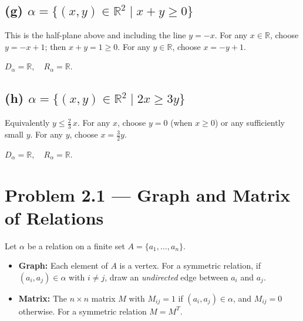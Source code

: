 \documentclass[12pt, a4paper]{article}
\newcommand{\R}{\mathbb{R}}
\begin{document}
\subsection*{(g)\; $\alpha = \{(x,y) \in \R^2 \mid x + y \ge 0\}$}

This is the half-plane above and including the line $y = -x$.
For any $x \in \R$, choose $y = -x + 1$; then $x + y = 1 \ge 0$.
For any $y \in \R$, choose $x = -y + 1$.

\begin{answerbox}
$D_\alpha = \R, \quad R_\alpha = \R.$
\end{answerbox}

\begin{center}
\end{center}

\subsection*{(h)\; $\alpha = \{(x,y) \in \R^2 \mid 2x \ge 3y\}$}

Equivalently $y \le \tfrac{2}{3}\,x$.
For any $x$, choose $y = 0$ (when $x \ge 0$) or any sufficiently small $y$.
For any $y$, choose $x = \tfrac{3}{2}y$.

\begin{answerbox}
$D_\alpha = \R, \quad R_\alpha = \R.$
\end{answerbox}

\newpage
\section{Problem 2.1 --- Graph and Matrix of Relations}

\begin{theorybox}
Let $\alpha$ be a relation on a finite set $A = \{a_1,\dots,a_n\}$.
\begin{itemize}[nosep]
  \item \textbf{Graph:} Each element of $A$ is a vertex.  For a symmetric relation, if $(a_i, a_j) \in \alpha$ with $i \ne j$, draw an \emph{undirected} edge between $a_i$ and $a_j$.
  \item \textbf{Matrix:} The $n \times n$ matrix $M$ with $M_{ij} = 1$ if $(a_i, a_j) \in \alpha$, and $M_{ij} = 0$ otherwise.  For a symmetric relation $M = M^T$.
\end{itemize}
\end{theorybox}
\end{document}
